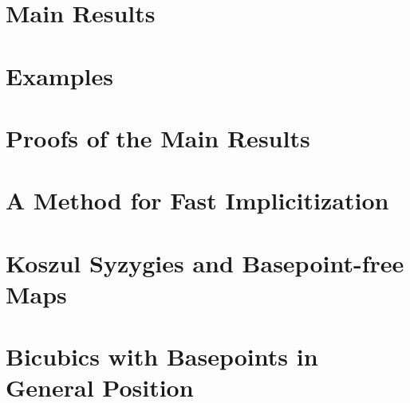 \documentclass[phd,tocprelim]{cornell}
\numberwithin{first}{chapter}
\begin{document}
\chapter{Main Results}
\label{ch:main-results}


\chapter{Examples}
\label{ch:examples}


\chapter{Proofs of the Main Results}
\label{ch:main-proofs}


\chapter{A Method for Fast Implicitization}
\label{ch:fast-method}


\chapter{Koszul Syzygies and Basepoint-free Maps}
\label{ch:koszul-bpf}


\chapter{Bicubics with Basepoints in General Position}
% 



\end{document}
